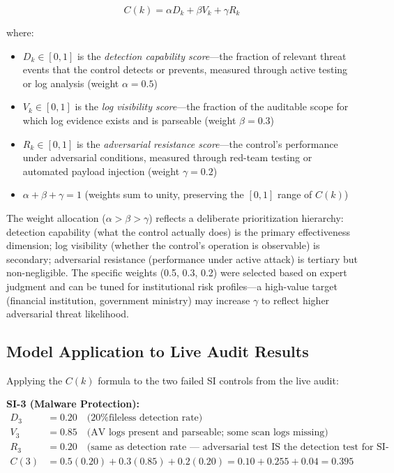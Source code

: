 \documentclass[12pt,oneside]{report}
\begin{document}
\begin{equation}
C(k) = \alpha D_k + \beta V_k + \gamma R_k
\label{eq:effectiveness}
\end{equation}

where:
\begin{itemize}
  \item $D_k \in [0,1]$ is the \textit{detection capability score}—the fraction of relevant threat events that the control detects or prevents, measured through active testing or log analysis (weight $\alpha = 0.5$)
  \item $V_k \in [0,1]$ is the \textit{log visibility score}—the fraction of the auditable scope for which log evidence exists and is parseable (weight $\beta = 0.3$)
  \item $R_k \in [0,1]$ is the \textit{adversarial resistance score}—the control's performance under adversarial conditions, measured through red-team testing or automated payload injection (weight $\gamma = 0.2$)
  \item $\alpha + \beta + \gamma = 1$ (weights sum to unity, preserving the $[0,1]$ range of $C(k)$)
\end{itemize}

The weight allocation ($\alpha > \beta > \gamma$) reflects a deliberate prioritization hierarchy: detection capability (what the control actually does) is the primary effectiveness dimension; log visibility (whether the control's operation is observable) is secondary; adversarial resistance (performance under active attack) is tertiary but non-negligible. The specific weights (0.5, 0.3, 0.2) were selected based on expert judgment and can be tuned for institutional risk profiles—a high-value target (financial institution, government ministry) may increase $\gamma$ to reflect higher adversarial threat likelihood.

\subsection{Model Application to Live Audit Results}

Applying the $C(k)$ formula to the two failed SI controls from the live audit:

\textbf{SI-3 (Malware Protection):}
\begin{align*}
D_3 &= 0.20 \quad \text{(20\% fileless detection rate)} \\
V_3 &= 0.85 \quad \text{(AV logs present and parseable; some scan logs missing)} \\
R_3 &= 0.20 \quad \text{(same as detection rate — adversarial test IS the detection test for SI-3)} \\
C(3) &= 0.5(0.20) + 0.3(0.85) + 0.2(0.20) = 0.10 + 0.255 + 0.04 = 0.395
\end{align*}
\end{document}
